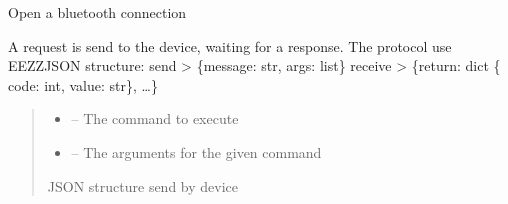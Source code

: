 \documentclass[letterpaper,10pt,english]{sphinxmanual}
\begin{document}
\begin{savenotes}
\begin{fulllineitems}
\begin{quote}
\begin{description}
\begin{itemize}
\end{itemize}

\end{description}\end{quote}

\begin{savenotes}\begin{fulllineitems}
\label{\detokenize{eezz:eezz.blueserv.TBluetoothService.open_connection}}
\pysigstartsignatures
{}
\pysigstopsignatures
\sphinxAtStartPar
Open a bluetooth connection

\end{fulllineitems}\end{savenotes}


\begin{savenotes}\begin{fulllineitems}
\label{\detokenize{eezz:eezz.blueserv.TBluetoothService.send_request}}
\pysigstartsignatures
{}
\pysigstopsignatures
\sphinxAtStartPar
A request is send to the device, waiting for a response.
The protocol use EEZZ\sphinxhyphen{}JSON structure:
send \sphinxhyphen{}>    \{message: str, args: list\}
receive \sphinxhyphen{}> \{return: dict \{ code: int, value: str\}, …\}
\begin{quote}\begin{description}
\begin{itemize}
\item {} 
\sphinxAtStartPar
{} – The command to execute

\item {} 
\sphinxAtStartPar
{} – The arguments for the given command

\end{itemize}

\sphinxAtStartPar
JSON structure send by device


\end{description}
\end{quote}
\end{fulllineitems}
\end{savenotes}
\end{fulllineitems}
\end{savenotes}
\end{document}
